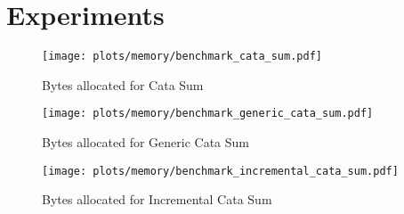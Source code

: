 \section{Experiments}

\begin{figure}[H]
    \centering
    \texttt{[image: plots/memory/benchmark\_cata\_sum.pdf]}
    \caption{Bytes allocated for Cata Sum}
    \label{fig-bytes-all-cata-sum}
\end{figure}

\begin{figure}[H]
    \centering
    \texttt{[image: plots/memory/benchmark\_generic\_cata\_sum.pdf]}
    \caption{Bytes allocated for Generic Cata Sum}
    \label{fig-bytes-all-gen-cata-sum}
\end{figure}

\begin{figure}[H]
    \centering
    \texttt{[image: plots/memory/benchmark\_incremental\_cata\_sum.pdf]}
    \caption{Bytes allocated for Incremental Cata Sum}
    \label{fig-bytes-all-inc-cata-sum}
\end{figure}
